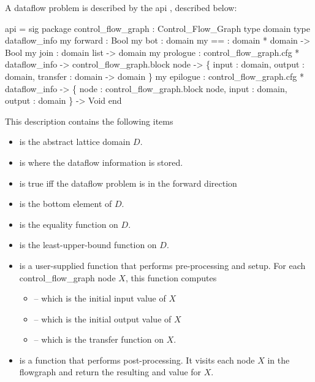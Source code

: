 A dataflow problem is described by the api , 
described below:
\begin{SML}
 api  = sig
   package control_flow_graph : Control_Flow_Graph
   type domain
   type dataflow_info
   my forward   : Bool
   my bot       : domain
   my ==        : domain * domain -> Bool
   my join      : domain list -> domain
   my prologue  : control_flow_graph.cfg * dataflow_info ->
                       control_flow_graph.block node ->
                           \{ input    : domain,
                             output   : domain,
                             transfer : domain -> domain
                           \}
   my epilogue  : control_flow_graph.cfg * dataflow_info ->
                       \{ node   : control_flow_graph.block node,
                         input  : domain,
                         output : domain
                       \} -> Void
 end
\end{SML}
This description contains the following items
\begin{itemize}
\item {} is the abstract lattice domain $D$.
\item {} is where the dataflow information
is stored.
\item {} is true iff the dataflow problem is in the
forward direction
\item {} is the bottom element of $D$.
\item \sml{==} is the equality function on $D$.
\item {} is the least-upper-bound function on $D$.
\item {} is a user-supplied function that performs
pre-processing and setup.  For each control_flow_graph node $X$, this function
computes
\begin{itemize}
 \item  {} -- which is the initial input value of $X$
 \item {} -- which is the initial output value of $X$
 \item {} -- which is the transfer function on $X$.
\end{itemize}
\item {} is a function that performs post-processing.
It visits each node $X$ in the flowgraph and return the resulting
 and  value for $X$. 
\end{itemize}

